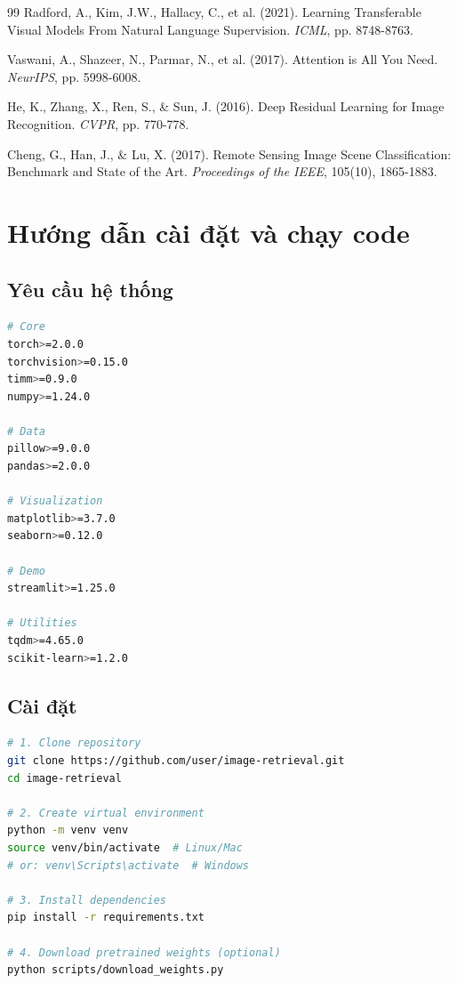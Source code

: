 \documentclass[12pt,a4paper]{article}
\begin{document}
\begin{thebibliography}{99}
Radford, A., Kim, J.W., Hallacy, C., et al. (2021).
Learning Transferable Visual Models From Natural Language Supervision.
\textit{ICML}, pp. 8748-8763.

Vaswani, A., Shazeer, N., Parmar, N., et al. (2017).
Attention is All You Need.
\textit{NeurIPS}, pp. 5998-6008.

He, K., Zhang, X., Ren, S., \& Sun, J. (2016).
Deep Residual Learning for Image Recognition.
\textit{CVPR}, pp. 770-778.

Cheng, G., Han, J., \& Lu, X. (2017).
Remote Sensing Image Scene Classification: Benchmark and State of the Art.
\textit{Proceedings of the IEEE}, 105(10), 1865-1883.

\end{thebibliography}


\appendix
\newpage
\section{Hướng dẫn cài đặt và chạy code}

\subsection{Yêu cầu hệ thống}

\begin{lstlisting}[language=bash,caption={requirements.txt}]
# Core
torch>=2.0.0
torchvision>=0.15.0
timm>=0.9.0
numpy>=1.24.0

# Data
pillow>=9.0.0
pandas>=2.0.0

# Visualization
matplotlib>=3.7.0
seaborn>=0.12.0

# Demo
streamlit>=1.25.0

# Utilities
tqdm>=4.65.0
scikit-learn>=1.2.0
\end{lstlisting}

\subsection{Cài đặt}

\begin{lstlisting}[language=bash,caption={Installation steps}]
# 1. Clone repository
git clone https://github.com/user/image-retrieval.git
cd image-retrieval

# 2. Create virtual environment
python -m venv venv
source venv/bin/activate  # Linux/Mac
# or: venv\Scripts\activate  # Windows

# 3. Install dependencies
pip install -r requirements.txt

# 4. Download pretrained weights (optional)
python scripts/download_weights.py
\end{lstlisting}
\end{document}
